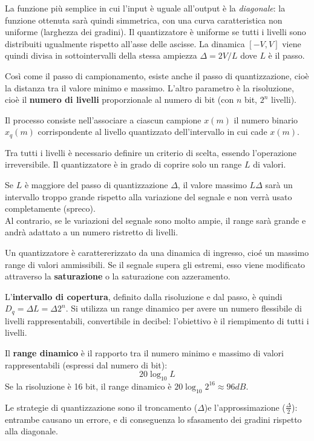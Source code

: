 La funzione più semplice in cui l'input è uguale all'output è la \textit{diagonale}: la funzione ottenuta sarà quindi simmetrica, con una curva caratteristica non uniforme (larghezza dei gradini). Il quantizzatore è uniforme se tutti i livelli sono distribuiti ugualmente rispetto all'asse delle ascisse. La dinamica $[-V, V]$ viene quindi divisa in sottointervalli della stessa ampiezza $\Delta = 2V / L$ dove $L$ è il passo. 

Così come il passo di campionamento, esiste anche il passo di quantizzazione, cioè la distanza tra il valore minimo e massimo. L'altro parametro è la risoluzione, cioè il \textbf{numero di livelli} proporzionale al numero di bit (con $n$ bit, $2^n$ livelli). 

Il processo consiste nell'associare a ciascun campione $x(m)$ il numero binario $x_q(m)$ corrispondente al livello quantizzato dell'intervallo in cui cade $x(m)$.

Tra tutti i livelli è necessario definire un criterio di scelta, essendo l'operazione irreversibile. Il quantizzatore è in grado di coprire solo un range $L$ di valori.

Se $L$ è maggiore del passo di quantizzazione $\Delta$, il valore massimo $L\Delta$ sarà un intervallo troppo grande rispetto alla variazione del segnale e non verrà usato completamente (spreco). \\
Al contrario, se le variazioni del segnale sono molto ampie, il range sarà grande e andrà adattato a un numero ristretto di livelli. 

Un quantizzatore è carattererizzato da una dinamica di ingresso, cioé un massimo range di valori ammissibili. Se il segnale supera gli estremi, esso viene modificato attraverso la \textbf{saturazione} o la saturazione con azzeramento.

L'\textbf{intervallo di copertura}, definito dalla risoluzione e dal passo, è quindi $D_q = \Delta L = \Delta 2^n$. Si utilizza un range dinamico per avere un numero flessibile di livelli rappresentabili, convertibile in decibel: l'obiettivo è il riempimento di tutti i livelli.

Il \textbf{range dinamico} è il rapporto tra il numero minimo e massimo di valori rappresentabili (espressi dal numero di bit):
$$20\log_{10} L$$
Se la risoluzione è 16 bit, il range dinamico è $20\log_{10} 2^{16} \approx 96 dB$.

Le strategie di quantizzazione sono il troncamento ($\Delta$)e l'approssimazione ($\frac{\Delta}{2}$): entrambe causano un errore, e di conseguenza lo sfasamento dei gradini rispetto alla diagonale. 

